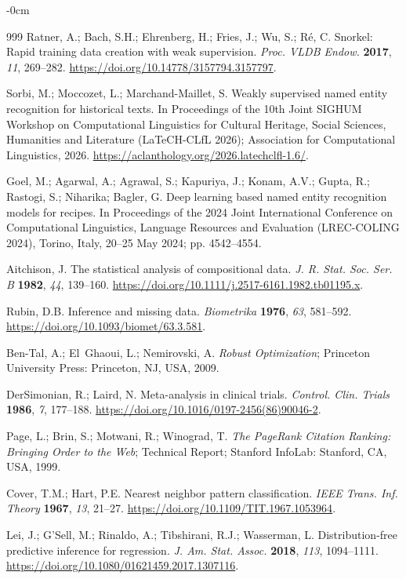 \documentclass[applsci,article,submit,oneauthor]{Definitions/mdpi}
\begin{document}
\begin{adjustwidth}{-\extralength}{0cm}
\begin{thebibliography}{999}
 Ratner, A.; Bach, S.H.; Ehrenberg, H.; Fries, J.; Wu, S.; R\'{e}, C. Snorkel: Rapid training data creation with weak supervision. \emph{Proc. VLDB Endow.} \textbf{2017}, \emph{11}, 269--282. \url{https://doi.org/10.14778/3157794.3157797}.

 Sorbi, M.; Moccozet, L.; Marchand-Maillet, S. Weakly supervised named entity recognition for historical texts. In Proceedings of the 10th Joint SIGHUM Workshop on Computational Linguistics for Cultural Heritage, Social Sciences, Humanities and Literature (LaTeCH-CLfL 2026); Association for Computational Linguistics, 2026. \url{https://aclanthology.org/2026.latechclfl-1.6/}.

 Goel, M.; Agarwal, A.; Agrawal, S.; Kapuriya, J.; Konam, A.V.; Gupta, R.; Rastogi, S.; Niharika; Bagler, G. Deep learning based named entity recognition models for recipes. In Proceedings of the 2024 Joint International Conference on Computational Linguistics, Language Resources and Evaluation (LREC-COLING 2024), Torino, Italy, 20--25 May 2024; pp. 4542--4554.

 Aitchison, J. The statistical analysis of compositional data. \emph{J. R. Stat. Soc. Ser. B} \textbf{1982}, \emph{44}, 139--160. \url{https://doi.org/10.1111/j.2517-6161.1982.tb01195.x}.

 Rubin, D.B. Inference and missing data. \emph{Biometrika} \textbf{1976}, \emph{63}, 581--592. \url{https://doi.org/10.1093/biomet/63.3.581}.

 Ben-Tal, A.; El~Ghaoui, L.; Nemirovski, A. \emph{Robust Optimization}; Princeton University Press: Princeton, NJ, USA, 2009.

 DerSimonian, R.; Laird, N. Meta-analysis in clinical trials. \emph{Control. Clin. Trials} \textbf{1986}, \emph{7}, 177--188. \url{https://doi.org/10.1016/0197-2456(86)90046-2}.

 Page, L.; Brin, S.; Motwani, R.; Winograd, T. \emph{The PageRank Citation Ranking: Bringing Order to the Web}; Technical Report; Stanford InfoLab: Stanford, CA, USA, 1999.

 Cover, T.M.; Hart, P.E. Nearest neighbor pattern classification. \emph{IEEE Trans. Inf. Theory} \textbf{1967}, \emph{13}, 21--27. \url{https://doi.org/10.1109/TIT.1967.1053964}.

 Lei, J.; G'Sell, M.; Rinaldo, A.; Tibshirani, R.J.; Wasserman, L. Distribution-free predictive inference for regression. \emph{J. Am. Stat. Assoc.} \textbf{2018}, \emph{113}, 1094--1111. \url{https://doi.org/10.1080/01621459.2017.1307116}.


\end{thebibliography}
\end{adjustwidth}
\end{document}
